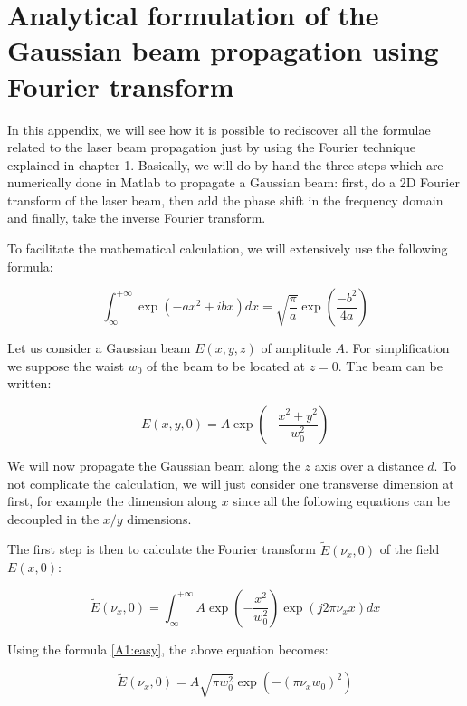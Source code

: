 \chapter{Analytical formulation of the Gaussian beam propagation using Fourier transform}

In this appendix, we will see how it is possible to rediscover all the formulae related to the laser beam propagation just by using the Fourier technique explained in chapter 1. Basically, we will do by hand the three steps which are numerically done in Matlab to propagate a Gaussian beam: first, do a 2D Fourier transform of the laser beam, then add the phase shift in the frequency domain and finally, take the inverse Fourier transform.

To facilitate the mathematical calculation, we will extensively use the following formula:

\begin{equation}
 \int^{+\infty}_{\infty} \exp \left( -ax^2 +ibx \right) dx = \sqrt{\frac{\pi}{a}} \exp \left( \frac{-b^2}{4a} \right)
\label{A1:easy}
\end{equation}


Let us consider a Gaussian beam $E(x,y,z)$ of amplitude $A$. For simplification we suppose the waist $w_0$ of the beam to be located at $z = 0$. The beam can be written:

\begin{equation}
    E(x,y,0) = A \exp\left(-\frac{x^2+y^2}{w_0^2}\right)
\end{equation}

We will now propagate the Gaussian beam along the $z$ axis over a distance $d$. To not complicate the calculation, we will just consider one transverse dimension at first, for example the dimension along $x$ since all the following equations can be decoupled in the $x/y$ dimensions.

The first step is then to calculate the Fourier transform $\widetilde{E}(\nu_x,0)$ of the field $E(x,0)$:

\begin{equation}
    \widetilde{E}(\nu_x,0) = \int^{+\infty}_{\infty} A \exp\left(-\frac{x^2}{w_0^2}\right) \exp(j2\pi \nu_x x) dx
\end{equation}

Using the formula \ref{A1:easy}, the above equation becomes:

\begin{equation}
    \widetilde{E}(\nu_x,0) = A \sqrt{\pi w_0^2} \exp\left(-(\pi \nu_x w_0)^2 \right)
\end{equation}


